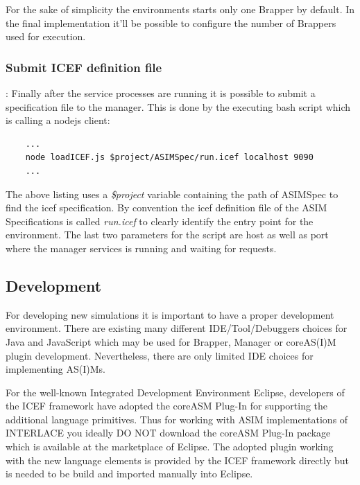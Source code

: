 For the sake of simplicity the environments starts only one Brapper by default. In the final implementation it'll be possible to configure the number of Brappers used for execution.

\subsubsection{Submit ICEF definition file}: Finally after the service processes are running it is possible to submit a specification file to the manager. This is done by the executing bash script which is calling a  nodejs client:

\begin{lstlisting}
	...
	node loadICEF.js $project/ASIMSpec/run.icef localhost 9090
	...
\end{lstlisting}

The above listing uses a \textit{\$project} variable containing the path of ASIMSpec to find the icef specification. By convention the icef definition file of the ASIM Specifications is called \textit{run.icef} to clearly identify the entry point for the environment.
The last two parameters for the script are host as well as port where the manager services is running and waiting for requests.

\subsection{Development}
\label{sec:development}

For developing new simulations it is important to have a proper development environment. There are existing many different IDE/Tool/Debuggers choices for Java and JavaScript which may be used for Brapper, Manager or coreAS(I)M plugin development. Nevertheless, there are only limited IDE choices for implementing AS(I)Ms.

For the well-known Integrated Development Environment Eclipse, developers of the ICEF framework have adopted the coreASM Plug-In for supporting the additional language primitives. Thus for working with ASIM implementations of INTERLACE you ideally DO NOT download the coreASM Plug-In package which is available at the marketplace of Eclipse. The adopted plugin working with the new language elements is provided by the ICEF framework directly but is needed to be build and imported manually into Eclipse.

